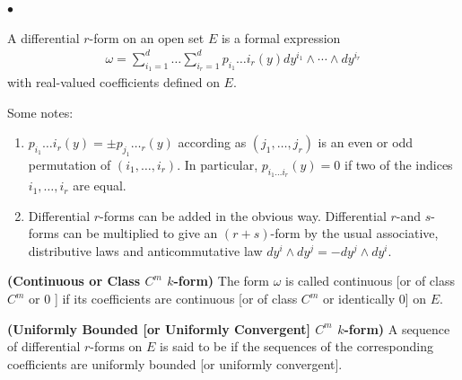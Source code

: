 \documentclass{article}
\newcommand{\bfs}[1]{\textbf{({#1}) }}
\begin{document}
$\bullet$ 

A differential $r$-form on an open set $E$ is a formal expression
\begin{align*}
\omega=\sum_{i_{1}=1}^{d} \ldots \sum_{i_{r}=1}^{d} p_{i_{1}} \ldots i_{r}(y) d y^{i_{1}} \wedge \cdots \wedge d y^{i_{r}}
\end{align*}
with real-valued coefficients defined on $E$.
\begin{rema}Some notes:
\begin{enumerate}
\item  $p_{i_{1}} \ldots i_{r}(y)=\pm p_{j_{1}} \ldots_{r}(y)$ according as $\left(j_{1}, \ldots, j_{r}\right)$ is an even or odd permutation of $\left(i_{1}, \ldots, i_{r}\right)$. In particular, $p_{i_{1} \ldots i_{r}}(y)=0$ if two of the indices $i_{1}, \ldots, i_{r}$ are equal. 
    \item Differential $r$-forms can be added in the obvious way. Differential $r$-and $s$-forms can be multiplied to give an $(r+s)$-form by the usual associative, distributive laws and anticommutative law $d y^{i} \wedge d y^{j}=-d y^{j} \wedge d y^{i}$.
\end{enumerate}
\end{rema}
\begin{defa}\bfs{Continuous or Class $C^{m}$ $k$-form}
The form $\omega$ is called continuous [or of class $C^{m}$ or 0 ] if its coefficients are continuous [or of class $C^{m}$ or identically 0] on $E$. 
\end{defa}

\begin{defa}\bfs{Uniformly Bounded [or Uniformly Convergent] $C^{m}$ $k$-form}
A sequence of differential $r$-forms on $E$ is said to be  if the sequences of the corresponding coefficients are uniformly bounded [or uniformly convergent]. 
\end{defa}
\end{document}
